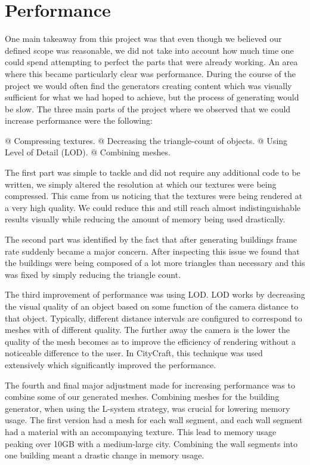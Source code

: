 \section{Performance}

One main takeaway from this project was that even though we believed our defined scope was reasonable, we did not take into account how much time one could spend attempting to perfect the parts that were already working.
An area where this became particularly clear was performance.
During the course of the project we would often find the generators creating content which was visually sufficient for what we had hoped to achieve, but the process of generating would be slow. 
The three main parts of the project where we observed that we could increase performance were the following:

\begin{easylist}
  @ Compressing textures.
  @ Decreasing the triangle-count of objects.
  @ Using Level of Detail (LOD).
  @ Combining meshes. 
 \end{easylist}
 
The first part was simple to tackle and did not require any additional code to be written, we simply altered the resolution at which our textures were being compressed.
This came from us noticing that the textures were being rendered at a very high quality.
We could reduce this and still reach almost indistinguishable results visually while reducing the amount of memory being used drastically. 

The second part was identified by the fact that after generating buildings frame rate suddenly became a major concern. 
After inspecting this issue we found that the buildings were being composed of a lot more triangles than necessary and this was fixed by simply reducing the triangle count. 

The third improvement of performance was using LOD.
LOD works by decreasing the visual quality of an object based on some function of the camera distance to that object.
Typically, different distance intervals are configured to correspond to meshes with of different quality.
The further away the camera is the lower the quality of the mesh becomes as to improve the efficiency of rendering without a noticeable difference to the user.
In CityCraft, this technique was used extensively which significantly improved the performance.

The fourth and final major adjustment made for increasing performance was to combine some of our generated meshes. 
Combining meshes for the building generator, when using the L-system strategy, was crucial for lowering memory usage. 
The first version had a mesh for each wall segment, and each wall segment had a material with an accompanying texture. 
This lead to memory usage peaking over 10GB with a medium-large city. 
Combining the wall segments into one building meant a drastic change in memory usage. 



